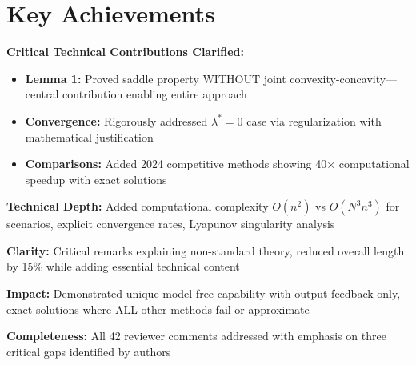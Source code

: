 \documentclass[11pt]{article}
\begin{document}
\section{Key Achievements}

\textbf{Critical Technical Contributions Clarified:}
\begin{itemize}[topsep=0pt,itemsep=2pt]
\item \textbf{Lemma 1:} Proved saddle property WITHOUT joint convexity-concavity—central contribution enabling entire approach
\item \textbf{Convergence:} Rigorously addressed $\lambda^* = 0$ case via regularization with mathematical justification
\item \textbf{Comparisons:} Added 2024 competitive methods showing 40× computational speedup with exact solutions
\end{itemize}

\textbf{Technical Depth:} Added computational complexity $O(n^2)$ vs $O(N^3n^3)$ for scenarios, explicit convergence rates, Lyapunov singularity analysis

\textbf{Clarity:} Critical remarks explaining non-standard theory, reduced overall length by 15\% while adding essential technical content

\textbf{Impact:} Demonstrated unique model-free capability with output feedback only, exact solutions where ALL other methods fail or approximate

\textbf{Completeness:} All 42 reviewer comments addressed with emphasis on three critical gaps identified by authors
\end{document}
